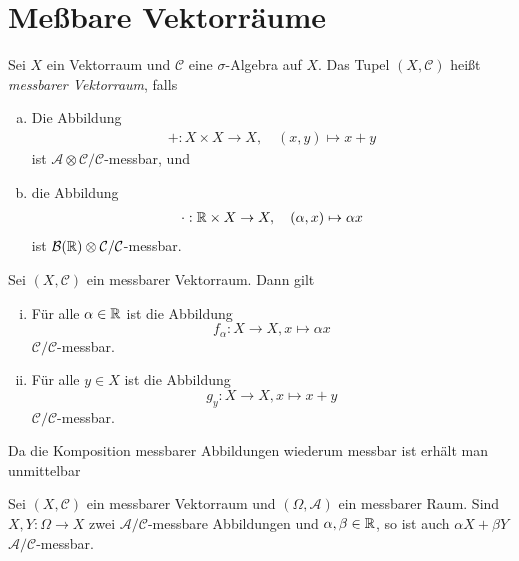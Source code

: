 \section{Meßbare Vektorräume}
\begin{mydef}
    Sei $X$ ein Vektorraum und $\mathcal{C}$ eine $\sigma$-Algebra auf $X$. Das Tupel $(X, \mathcal{C})$ heißt \textit{messbarer Vektorraum}, falls
    \begin{enumerate}[(a)]
        \item Die Abbildung 
        \begin{align*}
            + : X \times X \to X, \quad (x,y) \mapsto x + y
        \end{align*}
        ist $\mathcal{A}\otimes \mathcal{C}/\mathcal{C}$-messbar, und
        \item die Abbildung 
        \begin{align*}
            \cdot : \mathbb{R} \times X \to X, \quad  (\alpha, x) \mapsto \alpha x
        \end{align*}
        ist $\mathcal{B}(\mathbb{R}) \otimes \mathcal{C}/\mathcal{C}$-messbar. 
    \end{enumerate}
\end{mydef}

\begin{remark}
    Sei $(X, \mathcal{C})$ ein messbarer Vektorraum. Dann gilt
    \begin{enumerate}[(i)]
        \item Für alle $\alpha \in \mathbb{R}$ ist die Abbildung 
            $$f_{\alpha}: X \to X, x \mapsto \alpha x$$
        $\mathcal{C}/\mathcal{C}$-messbar. 
        \item Für alle $y \in X$ ist die Abbildung 
            $$g_y: X \to X, x \mapsto x + y$$
        $\mathcal{C}/\mathcal{C}$-messbar.
    \end{enumerate}
\end{remark}

Da die Komposition messbarer Abbildungen wiederum messbar ist erhält man unmittelbar
\begin{proposition}
    Sei $(X, \mathcal{C})$ ein messbarer Vektorraum und $(\Omega, \mathcal{A})$ ein messbarer Raum. 
    Sind $X,Y: \Omega \to X$ zwei $\mathcal{A}/\mathcal{C}$-messbare Abbildungen und $\alpha, \beta \in \mathbb{R}$, so ist auch $\alpha X + \beta Y$ $\mathcal{A}/\mathcal{C}$-messbar. 
\end{proposition}

